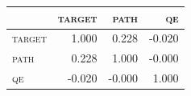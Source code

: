\begin{tabular}{lrrr}
\toprule
 & \textsc{target} & \textsc{path} & \textsc{qe} \\
\midrule
\textsc{target} & 1.000 & 0.228 & -0.020 \\
\textsc{path} & 0.228 & 1.000 & -0.000 \\
\textsc{qe} & -0.020 & -0.000 & 1.000 \\
\bottomrule
\end{tabular}

